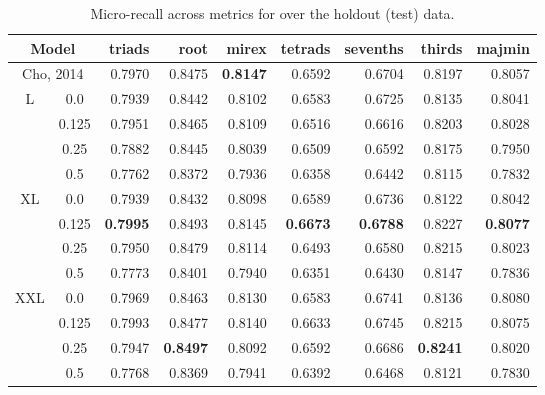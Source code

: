 \begin{table}[h]
\scriptsize
\begin{center}
\caption{Micro-recall across metrics for over the holdout (test) data.}
\label{tab:recall_test}
\begin{tabular}{cc|rrrrrrr}

\hline
\multicolumn{2}{c|}{Model}  & triads &   root &   mirex &   tetrads &   sevenths &   thirds &   majmin \\
\hline
\hline
\multicolumn{2}{c|}{Cho, 2014} &   0.7970 & 0.8475 &  \textbf{0.8147} &    0.6592 &     0.6704 &   0.8197 &   0.8057 \\
\hline
L & 0.0 &   0.7939 & 0.8442 &  0.8102 &    0.6583 &     0.6725 &   0.8135 &   0.8041 \\
  & 0.125 &   0.7951 & 0.8465 &  0.8109 &    0.6516 &     0.6616 &   0.8203 &   0.8028 \\
 & 0.25 &   0.7882 & 0.8445 &  0.8039 &    0.6509 &     0.6592 &   0.8175 &   0.7950 \\
  & 0.5 &   0.7762 & 0.8372 &  0.7936 &    0.6358 &     0.6442 &   0.8115 &   0.7832 \\
\hline
 XL &   0.0 &   0.7939 & 0.8432 &  0.8098 &    0.6589 &     0.6736 &   0.8122 &   0.8042 \\
  &  0.125 &   \textbf{0.7995} & 0.8493 &  0.8145 &    \textbf{0.6673} &     \textbf{0.6788} &   0.8227 &   \textbf{0.8077} \\
  &  0.25 &   0.7950 & 0.8479 &  0.8114 &    0.6493 &     0.6580 &   0.8215 &   0.8023 \\
  &  0.5 &   0.7773 & 0.8401 &  0.7940 &    0.6351 &     0.6430 &   0.8147 &   0.7836 \\
\hline
   XXL & 0.0 &   0.7969 & 0.8463 &  0.8130 &    0.6583 &     0.6741 &   0.8136 &   0.8080 \\
   &  0.125 &   0.7993 & 0.8477 &  0.8140 &    0.6633 &     0.6745 &   0.8215 &   0.8075 \\
   &  0.25 &   0.7947 & \textbf{0.8497} &  0.8092 &    0.6592 &     0.6686 &   \textbf{0.8241} &   0.8020 \\
   &  0.5 &   0.7768 & 0.8369 &  0.7941 &    0.6392 &     0.6468 &   0.8121 &   0.7830 \\
\hline
\end{tabular}
\end{center}
\end{table}




